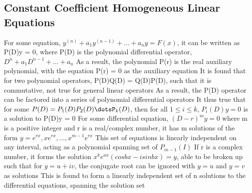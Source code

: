\documentclass[11 pt, twoside]{article}
\newenvironment{outline*}
{
	\begin{outline}[enumerate]
	}
	{\end{outline}
}
\begin{document}
\subsection{Constant Coefficient Homogeneous Linear Equations}
\begin{outline*}
\1 For some equation, $y^{(n)} + a_1y^{(n-1)} + \dots + a_ny = F(x)$, it can be written as P(D)y = 0, where P(D) is the polynomial differential operator, $D^n + a_1D^{n-1} + \dots + a_n$
\2 As a result, the polynomial P(r) is the real auxiliary polynomial, with the equation P(r) = 0 as the auxiliary equation
\2 It is found that for two polynomial operators, P(D)Q(D) = Q(D)P(D), such that it is commutative, not true for general linear operators
\3 As a result, the P(D) operator can be factored into a series of polynomial differential operators
\1 It thus true that for some $P(D) = P_1(D)P_2(D)\dotsP_k(D)$, then for all $1 \leq i \leq k$, $P_i(D)y = 0$ is a solution to P(D)y = 0
\2 For some differential equation, $(D-r)^my = 0$ where m is a positive integer and r is a real/complex number, it has m solutions of the form $y = e^{rx}, xe^{rx}, \dots, x^{m-1}e^{rx}$
\2 This set of equations is linearly independent on any interval, acting as a polynomial spanning set of $P_{m-1}(I)$
\2 If r is a complex number, it forms the solution $x^ke^{ax}(cosbx - isinbx) = y$, able to be broken up such that for $y = u + iv$, the conjugate root can be ignored with $y = u$ and $y = v$ as solutions
\2 This is found to form a linearly independent set of n solutions to the differential equations, spanning the solution set
\end{outline*}
\end{document}
